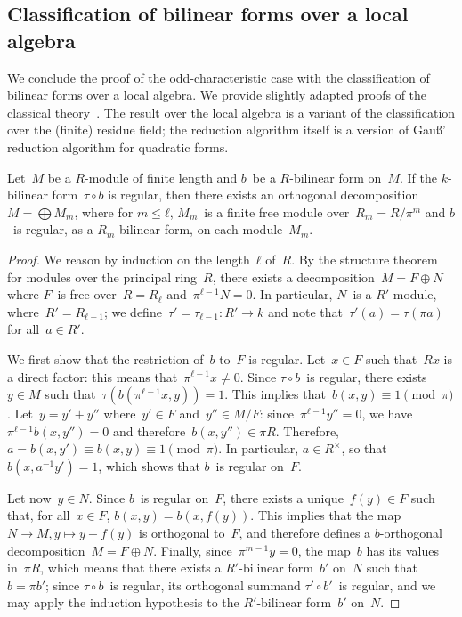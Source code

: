 \documentclass{article}%
\begin{document}
\subsection{Classification of bilinear forms over a local algebra}%

We conclude the proof of the odd-characteristic case with the
classification of bilinear forms over a local algebra.
We provide slightly adapted proofs of the classical
theory~\cite{milnorhusemoller,omeara}.
The result over the local algebra is a variant of
the classification over the (finite) residue field;
the reduction algorithm itself is a version of Gauß' reduction algorithm
for quadratic forms.

\begin{prop}\label{prop:diag-bigblock}%
Let~$M$ be a $R$-module of finite length and $b$~be a $R$-bilinear form
on~$M$.
If the $k$-bilinear form~$τ ∘ b$ is regular,
then there exists an orthogonal decomposition~$M = ⨁ M_m$,
where for $m ≤ ℓ$, $M_m$~is a finite free module over~$R_m = R / π^m$
and $b$~is regular, as a $R_m$-bilinear form, on each module~$M_m$.
\end{prop}


\begin{proof}
We reason by induction on the length~$ℓ$ of~$R$. By the structure theorem for
modules over the principal ring~$R$, there exists a decomposition~$M = F
⊕ N$ where $F$~is free over~$R = R_ℓ$ and~$π^{ℓ-1} N = 0$. In
particular, $N$~is a $R'$-module, where~$R' = R_{ℓ-1}$; we define~$τ'
= τ_{ℓ-1}: R' → k$ and note that~$τ'(a) = τ(π a)$ for all~$a ∈ R'$.

We first show that the restriction of~$b$ to~$F$ is regular. Let~$x ∈ F$
such that~$R x$ is a direct factor: this means that~$π^{ℓ-1} x ≠ 0$.
Since $τ ∘ b$~is regular, there exists~$y ∈ M$ such that~$τ(b(π^{ℓ-1} x,
y)) = 1$. This implies that~$b(x, y) ≡ 1 \pmod{π}$. Let~$y = y' + y''$
where~$y' ∈ F$ and~$y'' ∈ M/F$: since~$π^{ℓ-1} y'' = 0$, we have~$π^{ℓ-1}
b(x, y'') = 0$ and therefore~$b(x, y'') ∈ π R$. Therefore, $a = b(x, y')
≡ b(x, y) ≡ 1 \pmod{π}$. In particular, $a ∈ R^{×}$, so that~$b(x, a^{-1}
y') = 1$, which shows that $b$~is regular on~$F$.

Let now~$y ∈ N$. Since $b$~is regular on~$F$, there exists a unique~$f(y)
∈ F$ such that, for all~$x ∈ F$, $b(x, y) = b(x, f(y))$. This implies
that the map~$N → M, y ↦ y - f(y)$ is orthogonal to~$F$, and therefore
defines a $b$-orthogonal decomposition~$M = F ⊕ N$. Finally,
since~$π^{m-1} y = 0$, the map~$b$ has its values in~$π R$, which means
that there exists a $R'$-bilinear form~$b'$ on~$N$ such that~$b = π b'$;
since $τ ∘ b$~is regular, its orthogonal summand $τ' ∘ b'$~is regular,
and we may apply the induction hypothesis to the $R'$-bilinear form~$b'$
on~$N$.
\end{proof}%
\end{document}

